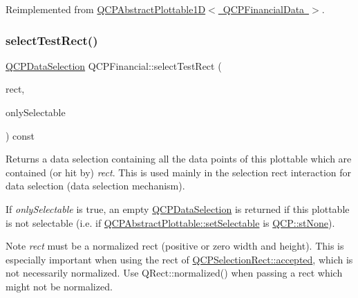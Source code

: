 Reimplemented from \mbox{\hyperlink{class_q_c_p_abstract_plottable1_d_a071e2df66ba1746067dfcb5e27947b43}{Q\+C\+P\+Abstract\+Plottable1\+D$<$ Q\+C\+P\+Financial\+Data $>$}}.

\mbox{\label{class_q_c_p_financial_a3c5beb1ab028a1dba845fc9dcffc7cf4}} 
\subsubsection{\texorpdfstring{select\+Test\+Rect()}{selectTestRect()}}
{\footnotesize\ttfamily \mbox{\hyperlink{class_q_c_p_data_selection}{Q\+C\+P\+Data\+Selection}} Q\+C\+P\+Financial\+::select\+Test\+Rect (\begin{DoxyParamCaption}\item[{const Q\+RectF \&}]{rect,  }\item[{bool}]{only\+Selectable }\end{DoxyParamCaption}) const\hspace{0.3cm}{\ttfamily [virtual]}}





Returns a data selection containing all the data points of this plottable which are contained (or hit by) {\itshape rect}. This is used mainly in the selection rect interaction for data selection (data selection mechanism).

If {\itshape only\+Selectable} is true, an empty \mbox{\hyperlink{class_q_c_p_data_selection}{Q\+C\+P\+Data\+Selection}} is returned if this plottable is not selectable (i.\+e. if \mbox{\hyperlink{class_q_c_p_abstract_plottable_ac238d6e910f976f1f30d41c2bca44ac3}{Q\+C\+P\+Abstract\+Plottable\+::set\+Selectable}} is \mbox{\hyperlink{namespace_q_c_p_ac6cb9db26a564b27feda362a438db038aa64628e338a2dd1e6f0dc84dec0b63fe}{Q\+C\+P\+::st\+None}}).

\begin{DoxyNote}{Note}
{\itshape rect} must be a normalized rect (positive or zero width and height). This is especially important when using the rect of \mbox{\hyperlink{class_q_c_p_selection_rect_a15a43542e1f7b953a44c260b419e6d2c}{Q\+C\+P\+Selection\+Rect\+::accepted}}, which is not necessarily normalized. Use {\ttfamily Q\+Rect\+::normalized()} when passing a rect which might not be normalized. 
\end{DoxyNote}


